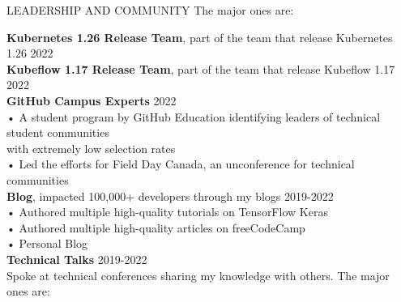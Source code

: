 \documentclass{resume} %
\begin{document}
\begin{rSection}{LEADERSHIP AND COMMUNITY}
The major ones are:

{\bf Kubernetes 1.26 Release Team}, part of the team that release Kubernetes 1.26 \hfill {2022}\\
{\bf Kubeflow 1.17 Release Team}, part of the team that release Kubeflow 1.17 \hfill {2022}\\
{\bf GitHub Campus Experts} \hfill {2022}\\
• A student program by GitHub Education identifying leaders of technical student communities\\with extremely low selection rates\\
• Led the efforts for Field Day Canada, an unconference for technical communities\\
{\bf Blog}, impacted 100,000+ developers through my blogs \hfill {2019-2022}\\
• Authored multiple high-quality tutorials on TensorFlow Keras\\
• Authored multiple high-quality articles on freeCodeCamp\\
• Personal Blog\\
{\bf Technical Talks} \hfill {2019-2022}\\
Spoke at technical conferences sharing my knowledge with others. The major ones are:


\end{rSection}
\end{document}
